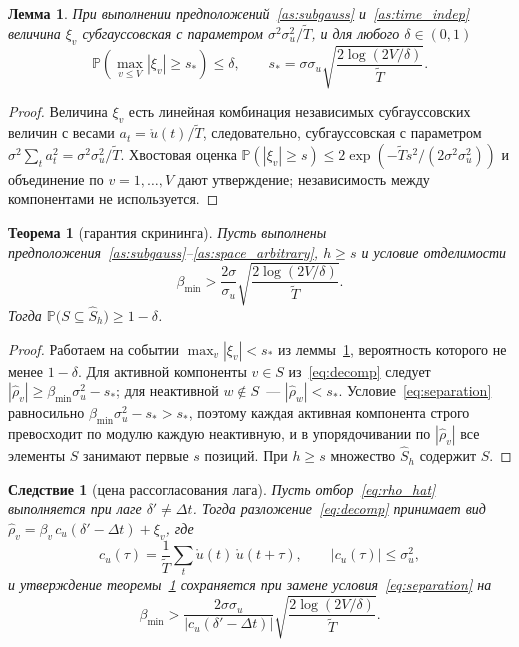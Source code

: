 \documentclass[12pt]{article}
\theoremstyle{plain}
\newtheorem{theorem}{Теорема}
\newtheorem{lemma}{Лемма}
\newtheorem{corollary}{Следствие}
\theoremstyle{definition}
\newcommand{\bbP}{\mathbb{P}}
\begin{document}
\begin{lemma}\label{lem:noise}
При выполнении предположений~\ref{as:subgauss} и~\ref{as:time_indep} величина $\xi_v$ субгауссовская с параметром $\sigma^2 \sigma_u^2 / \widetilde{T}$, и для любого $\delta \in (0,1)$
\[
\bbP\left( \max_{v \le V} |\xi_v| \ge s_* \right) \le \delta,
\qquad
s_* = \sigma \sigma_u \sqrt{\frac{2 \log (2V/\delta)}{\widetilde{T}}} .
\]
\end{lemma}

\begin{proof}
Величина $\xi_v$ есть линейная комбинация независимых субгауссовских величин с весами $a_t = \mathring{u}(t)/\widetilde{T}$, следовательно, субгауссовская с параметром $\sigma^2 \sum_t a_t^2 = \sigma^2 \sigma_u^2 / \widetilde{T}$. Хвостовая оценка $\bbP(|\xi_v| \ge s) \le 2 \exp(-\widetilde{T} s^2 / (2 \sigma^2 \sigma_u^2))$ и объединение по $v = 1, \ldots, V$ дают утверждение; независимость между компонентами не используется.
\end{proof}

\begin{theorem}[гарантия скрининга]\label{thm:screening}
Пусть выполнены предположения~\ref{as:subgauss}--\ref{as:space_arbitrary}, $h \ge s$ и условие отделимости
\begin{equation}\label{eq:separation}
\beta_{\min} > \frac{2\sigma}{\sigma_u} \sqrt{\frac{2 \log (2V/\delta)}{\widetilde{T}}} .
\end{equation}
Тогда $\bbP\big( S \subseteq \widehat{S}_h \big) \ge 1 - \delta$.
\end{theorem}

\begin{proof}
Работаем на событии $\max_v |\xi_v| < s_*$ из леммы~\ref{lem:noise}, вероятность которого не менее $1-\delta$. Для активной компоненты $v \in S$ из~\eqref{eq:decomp} следует $|\widehat{\rho}_v| \ge \beta_{\min} \sigma_u^2 - s_*$; для неактивной $w \notin S$~--- $|\widehat{\rho}_w| < s_*$. Условие~\eqref{eq:separation} равносильно $\beta_{\min}\sigma_u^2 - s_* > s_*$, поэтому каждая активная компонента строго превосходит по модулю каждую неактивную, и в упорядочивании по $|\widehat{\rho}_v|$ все элементы $S$ занимают первые $s$ позиций. При $h \ge s$ множество $\widehat{S}_h$ содержит $S$.
\end{proof}

\begin{corollary}[цена рассогласования лага]\label{cor:lag}
Пусть отбор~\eqref{eq:rho_hat} выполняется при лаге $\delta' \ne \Delta t$. Тогда разложение~\eqref{eq:decomp} принимает вид $\widehat{\rho}_v = \beta_v\, c_u(\delta' - \Delta t) + \xi_v$, где
\[
c_u(\tau) = \frac{1}{\widetilde{T}} \sum_t \mathring{u}(t)\, \mathring{u}(t + \tau),
\qquad |c_u(\tau)| \le \sigma_u^2,
\]
и утверждение теоремы~\ref{thm:screening} сохраняется при замене условия~\eqref{eq:separation} на
\[
\beta_{\min} > \frac{2\sigma \sigma_u}{|c_u(\delta' - \Delta t)|} \sqrt{\frac{2 \log (2V/\delta)}{\widetilde{T}}} .
\]
\end{corollary}
\end{document}
